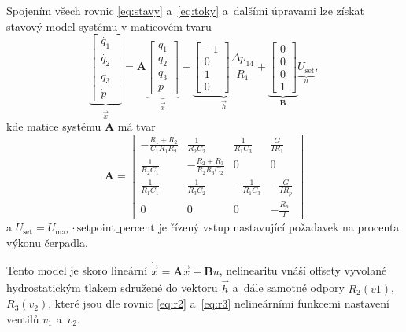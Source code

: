 \documentclass[conference]{IEEEtran}
\begin{document}
Spojením všech rovnic \eqref{eq:stavy} a~\eqref{eq:toky} a~dalšími úpravami lze získat stavový model systému v maticovém tvaru
\begin{equation}
    \underbrace{\begin{bmatrix}
        \dot{q_1 }\\
        \dot{q_2 }\\
        \dot{q_3 }\\
        \dot{p}
    \end{bmatrix}}_{\dot{\vec{x}}}
     = \mathbf{A} \underbrace{\begin{bmatrix}
        q_1 \\
        q_2 \\
        q_3 \\
        p
    \end{bmatrix}}_{\vec{x}} + \underbrace{\begin{bmatrix}
        -1 \\ 0 \\ 1 \\ 0
    \end{bmatrix}\frac{\Delta p_{14}}{R_1}}_{\vec{h}} + \underbrace{\begin{bmatrix}
        0 \\ 0 \\ 0 \\ 1
    \end{bmatrix}}_{\mathbf{B}} \underbrace{U_\text{set}}_{u},
\end{equation}
kde matice systému $\mathbf{A}$ má tvar
\begin{equation}    
    \mathbf{A} = \begin{bmatrix}
        -\frac{R_1+R_2}{C_1R_1R_2} & \frac{1}{R_2C_2} & \frac{1}{R_1C_3} & \frac{G}{I R_1} \\
        \frac{1}{R_2 C_1} & -\frac{R_2+R_3}{R_2R_3C_2}&0 & 0\\
        \frac{1}{R_1C_1} & \frac{1}{R_3C_2} & -\frac{1}{R_1C_3} &- \frac{G}{I R_p} \\
        0 & 0 & 0 & -\frac{R_p}{I}
    \end{bmatrix}
\end{equation}
a $U_\text{set} = U_\text{max} \cdot \text{setpoint\_percent}$ je řízený vstup nastavující požadavek na procenta výkonu čerpadla.

Tento model je skoro lineární $\dot{\vec{x}} = \mathbf{A}\vec{x} + \mathbf{B}u$, nelinearitu vnáší offsety vyvolané hydrostatickým tlakem
sdružené do vektoru $\vec{h}$ a~dále samotné odpory $R_2(v1)$, $R_3(v_2)$, které jsou dle rovnic \eqref{eq:r2} a~\eqref{eq:r3} nelineárními
funkcemi nastavení ventilů $v_1$ a~$v_2$.
\end{document}
